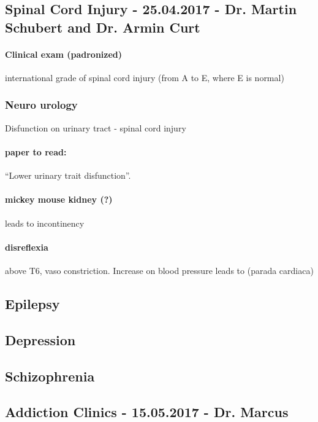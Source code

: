 \documentclass[12pt,article,oneside,a4paper]{memoir}
\begin{document}
\subsection{Spinal Cord Injury - 25.04.2017 - Dr. Martin Schubert and Dr. Armin Curt}

\paragraph{Clinical exam (padronized)} international grade of spinal cord injury (from A to E, where E is normal)

\subsubsection{Neuro urology}
Disfunction on urinary tract - spinal cord injury
\paragraph{paper to read:} ``Lower urinary trait disfunction''.

\paragraph{mickey mouse kidney (?)} leads to incontinency

\paragraph{disreflexia}  above T6, vaso constriction. Increase on blood pressure leads to (parada cardiaca)

\subsection{Epilepsy}
 
\subsection{Depression}

\subsection{Schizophrenia}

\subsection{Addiction Clinics - 15.05.2017 - Dr. Marcus}
\end{document}
